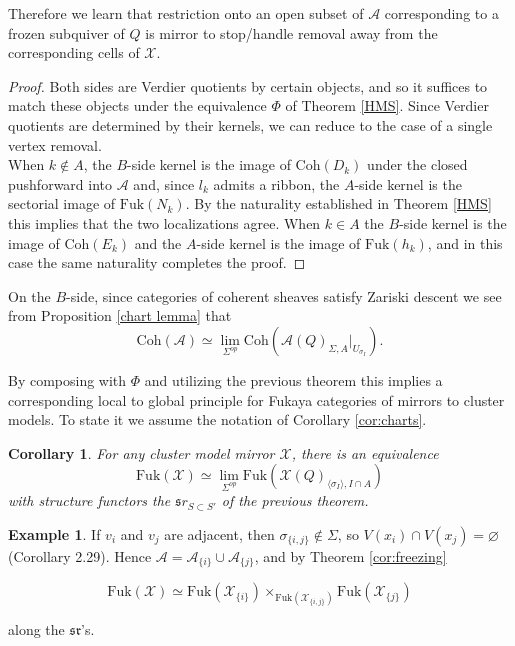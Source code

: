 \documentclass[11pt]{amsart}
\newtheorem{cor}[thm]{Corollary}
\theoremstyle{definition}
\newtheorem{exmp}[thm]{Example}
\theoremstyle{remark}
\newcommand{\A}{\mathcal{A}}
\newcommand{\X}{\mathcal{X}}
\newcommand{\Coh}{\mathrm{Coh}}
\newcommand{\Fuk}{\mathrm{Fuk}}
\renewcommand{\emptyset}{\varnothing}
\numberwithin{equation}{section}
\begin{document}
Therefore we learn that restriction onto an open subset of $\A$ corresponding to a frozen subquiver of $Q$ is mirror to stop/handle removal away from the corresponding cells of $\X$.

\begin{proof}
    Both sides are Verdier quotients by certain objects, and so it suffices to match these objects under the equivalence $\Phi$ of Theorem \ref{HMS}. Since Verdier quotients are determined by their kernels, we can reduce to the case of a single vertex removal.\\

    When $k \notin A$, the $B$-side kernel is the image of $\Coh(D_k)$ under the closed pushforward into $\A$ and, since $l_k$ admits a ribbon, the $A$-side kernel is the sectorial image of $\Fuk(N_k)$. By the naturality established in Theorem \ref{HMS} this implies that the two localizations agree. When $k \in A$ the $B$-side kernel is the image of $\Coh(E_k)$ and the $A$-side kernel is the image of $\Fuk(h_k)$, and in this case the same naturality completes the proof.
\end{proof}

On the $B$-side, since categories of coherent sheaves satisfy Zariski descent we see from Proposition \ref{chart lemma} that $$\Coh(\A) \simeq \lim_{\Sigma^{op}} \Coh(\mathcal{A}(Q)_{\Sigma, A}|_{U_{\sigma_I}}).$$

By composing with $\Phi$ and utilizing the previous theorem this implies a corresponding local to global principle for Fukaya categories of mirrors to cluster models. To state it we assume the notation of Corollary \ref{cor:charts}.

\begin{cor}\label{descent}
For any cluster model mirror $\X$, there is an equivalence $$\Fuk(\X) \simeq \lim_{\Sigma^{op}} \Fuk(\mathcal{X}(Q)_{\langle \sigma_I\rangle, I \cap A})$$ \noindent with structure functors the $\mathfrak sr_{S\subset S'}$ of the previous theorem.
\end{cor}

\begin{exmp}
    If $v_i$ and $v_j$ are adjacent, then $\sigma_{\{i,j\}}\notin\Sigma$, so $V(x_i)\cap V(x_j)=\emptyset$ (Corollary 2.29). Hence $\mathcal A=\mathcal A_{\{i\}}\cup\mathcal A_{\{j\}}$, and by Theorem \ref{cor:freezing}

$$\Fuk(\X)\simeq \Fuk(\X_{\{i\}})\times_{\Fuk(\X_{\{i,j\}})} \Fuk(\X_{\{j\}})$$

\noindent along the $\mathfrak{sr}$’s.
\end{exmp}
\end{document}
